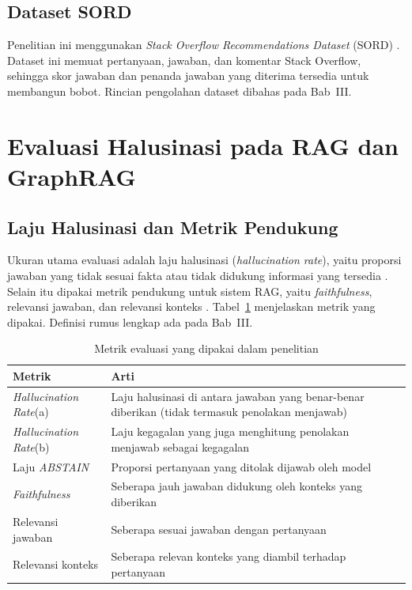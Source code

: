 \subsection{Dataset SORD}

Penelitian ini menggunakan \emph{Stack Overflow Recommendations Dataset} (SORD) \autocite{Fatima2026}. Dataset ini memuat pertanyaan, jawaban, dan komentar Stack Overflow, sehingga skor jawaban dan penanda jawaban yang diterima tersedia untuk membangun bobot. Rincian pengolahan dataset dibahas pada Bab~III.

\section{Evaluasi Halusinasi pada RAG dan GraphRAG}
\label{sec:evaluasi}

\subsection{Laju Halusinasi dan Metrik Pendukung}

Ukuran utama evaluasi adalah laju halusinasi (\emph{hallucination rate}), yaitu proporsi jawaban yang tidak sesuai fakta atau tidak didukung informasi yang tersedia \autocite{Syeda2026}. Selain itu dipakai metrik pendukung untuk sistem RAG, yaitu \emph{faithfulness}, relevansi jawaban, dan relevansi konteks \autocite{Kamalipour2026}. Tabel~\ref{tab:metrik-literatur} menjelaskan metrik yang dipakai. Definisi rumus lengkap ada pada Bab~III.

\begin{table}[!htbp]
\centering
\caption{Metrik evaluasi yang dipakai dalam penelitian}
\label{tab:metrik-literatur}
\small
\begin{tabular}{|p{3.2cm}|p{10.2cm}|}
\hline
\textbf{Metrik} & \textbf{Arti} \\
\hline
\emph{Hallucination Rate}(a) &
Laju halusinasi di antara jawaban yang benar-benar diberikan (tidak termasuk penolakan menjawab) \\
\hline
\emph{Hallucination Rate}(b) &
Laju kegagalan yang juga menghitung penolakan menjawab sebagai kegagalan \\
\hline
Laju \emph{ABSTAIN} &
Proporsi pertanyaan yang ditolak dijawab oleh model \\
\hline
\emph{Faithfulness} &
Seberapa jauh jawaban didukung oleh konteks yang diberikan \\
\hline
Relevansi jawaban &
Seberapa sesuai jawaban dengan pertanyaan \\
\hline
Relevansi konteks &
Seberapa relevan konteks yang diambil terhadap pertanyaan \\
\hline
\end{tabular}
\end{table}

